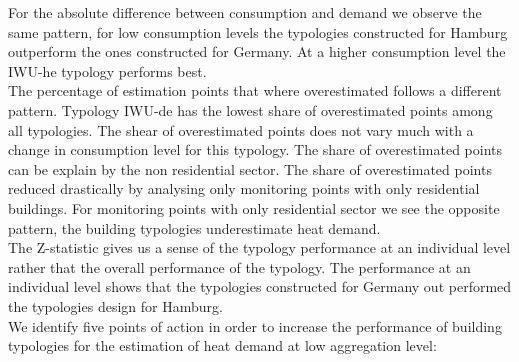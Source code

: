 \documentclass[authoryear,preprint,review,12pt]{elsarticle}
\begin{document}
\begin{linenumbers}
For the absolute difference between consumption and demand we observe the same
pattern, for low consumption levels the typologies constructed for Hamburg
outperform the ones constructed for Germany. At a higher consumption level the
IWU-he typology performs best.\\

The percentage of estimation points that where overestimated follows a
different pattern. Typology IWU-de has the lowest share of overestimated points
among all typologies. The shear of overestimated points does not vary much with
a change in consumption level for this typology.
The share of overestimated points can be explain by the non residential sector.
The share of overestimated points reduced drastically by analysing only
monitoring points with only residential buildings. For monitoring points with
only residential sector we see the opposite pattern, the building typologies
underestimate heat demand.\\

The Z-statistic gives us a sense of the typology performance at an individual
level rather that the overall performance of the typology. The performance at
an individual level shows that the typologies constructed for Germany out
performed the typologies design for Hamburg.\\

We identify five points of action in order to increase the performance of
building typologies for the estimation of heat demand at low aggregation level:


\end{linenumbers}
\end{document}
